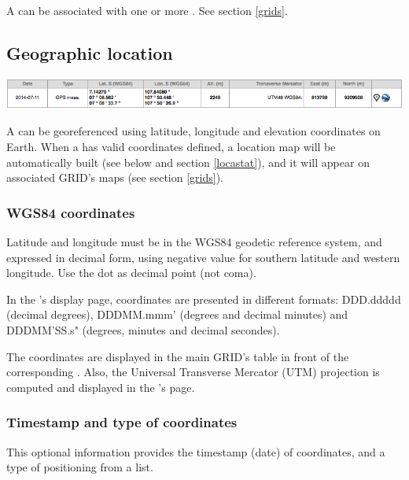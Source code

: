 A  can be associated with one or more . See section \ref{grids}.

\subsection{Geographic location}

\includegraphics[width=\textwidth]{figures/NODE_location.png}

A  can be georeferenced using latitude, longitude and elevation coordinates on Earth. When a  has valid coordinates defined, a location map will be automatically built (see below and section \ref{locastat}), and it will appear on associated GRID's maps (see section \ref{grids}).

\subsubsection{WGS84 coordinates}

Latitude and longitude must be in the WGS84 geodetic reference system, and expressed in decimal form, using negative value for southern latitude and western longitude. Use the dot as decimal point (not coma).

In the 's display page, coordinates are presented in different formats: DDD.ddddd (decimal degrees), DDD\degree MM.mmm' (degrees and decimal minutes) and DDD\degree MM'SS.s" (degrees, minutes and decimal secondes).

The coordinates are displayed in the main GRID's table in front of the corresponding . Also, the Universal Transverse Mercator (UTM) projection is computed and displayed in the 's page.

\subsubsection{Timestamp and type of coordinates}

This optional information provides the timestamp (date) of coordinates, and a type of positioning from a list.




